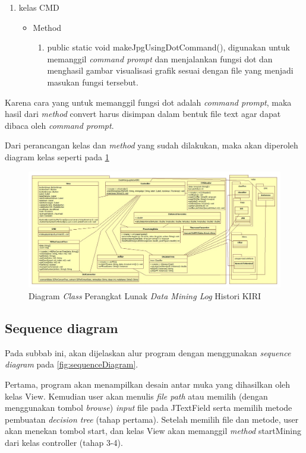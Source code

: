 \begin{enumerate}
	\item kelas CMD
	\begin{itemize}
		\item Method
		\begin{enumerate}
			\item public static void makeJpgUsingDotCommand(), digunakan untuk memanggil \textsl{command prompt} dan menjalankan fungsi dot dan menghasil gambar visualisasi grafik sesuai dengan file yang menjadi masukan fungsi tersebut.
		\end{enumerate}
	\end{itemize}
\end{enumerate}

Karena cara yang untuk memanggil fungsi dot adalah \textsl{command prompt}, maka hasil dari \textsl{method} convert harus disimpan dalam bentuk file text agar dapat dibaca oleh \textsl{command prompt}.

Dari perancangan kelas dan \textsl{method} yang sudah dilakukan, maka akan diperoleh diagram kelas seperti pada \ref{fig:classDiagram2}

\begin{figure}[H]
\includegraphics[scale=0.5, angle =90]{Gambar/classdiagram2.jpg}
\caption[Diagram \textsl{Class} Perangkat Lunak \textsl{Data Mining Log} Histori KIRI]{Diagram \textsl{Class} Perangkat Lunak \textsl{Data Mining Log} Histori KIRI} 
\label{fig:classDiagram2}
\end{figure}

\subsection{Sequence diagram}

Pada subbab ini, akan dijelaskan alur program dengan menggunakan \textsl{sequence diagram} pada \ref{fig:sequenceDiagram}.

Pertama, program akan menampilkan desain antar muka yang dihasilkan oleh kelas View. Kemudian user akan menulis \textsl{file path} atau memilih (dengan menggunakan tombol \textsl{browse}) \textsl{input} file pada JTextField serta memilih metode pembuatan \textsl{decision tree} (tahap  pertama). Setelah memilih file dan metode, user akan menekan tombol start, dan kelas View akan memanggil \textsl{method} startMining dari kelas controller (tahap 3-4).

